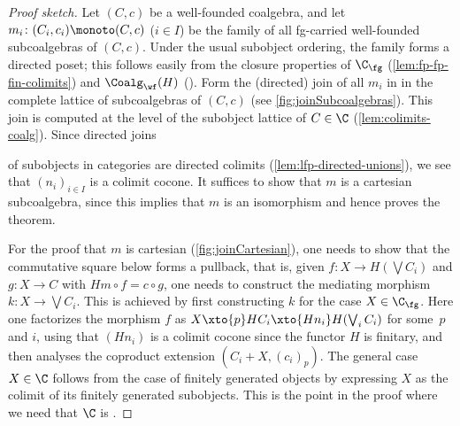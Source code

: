 \documentclass[a4paper,UKenglish, autoref, numberwithinsect, final]{lipics-v2021}
\numberwithin{equation}{section}
\theoremstyle{plain}
\theoremstyle{definition}
\begin{document}
%
%
%

\begin{proof}[Proof sketch]
Let $(C,c)$ be a well-founded coalgebra, and let $m_i\colon (C_i,c_i)\monoto (C,c)$ ($i\in I$) be the family of all fg-carried well-founded subcoalgebras of $(C,c)$. Under the usual subobject ordering, the family forms a directed poset; this follows easily from the closure properties of $\C_\fg$ (\autoref{lem:fp-fp-fin-colimits}) and $\Coalg_{\wf}(H)$ (). Form the (directed) join of all $m_i$ in
in the complete lattice of subcoalgebras of $(C,c)$ (see \autoref{fig:joinSubcoalgebras}). This join is computed at the level of the subobject lattice of $C\in \C$ (\autoref{lem:colimits-coalg}). Since directed joins 


\noindent of subobjects in \lfp categories are directed colimits (\autoref{lem:lfp-directed-unions}), we see that $(n_i)_{i\in I}$ is a colimit cocone. It suffices to show that $m$ is a cartesian subcoalgebra, since this implies that $m$ is an isomorphism and hence proves the theorem. 

For the proof that $m$ is cartesian (\autoref{fig:joinCartesian}), one needs to show that the commutative square below forms a pullback, that is, given $f\colon X\to H(\bigvee C_i)$ and $g\colon X\to C$ with
$Hm\circ f = c\circ g$, one
needs to construct the mediating morphism $k\colon X\to \bigvee C_i$. This is achieved by first constructing $k$ for the case $X\in \C_\fg$. Here one factorizes the morphism $f$ as $X\xto{p} HC_i \xto{Hn_i} H(\bigvee_i C_i)$ for some~$p$ and $i$, using that $(Hn_i)$ is a colimit cocone since the functor $H$ is finitary, and then analyses the coproduct extension $(C_i+X,(c_i)_p)$. The general case $X\in \C$ follows from the case 
of finitely generated objects by expressing $X$ as the colimit of its finitely generated subobjects. This is the point in the proof where we need that $\C$ is \lfp. 
\end{proof}
\end{document}
